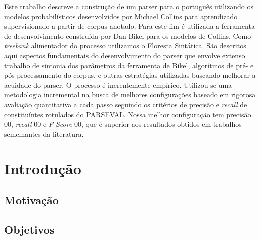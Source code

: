 \documentclass[a4paper]{abnt}
\begin{document}


\pagestyle{plain}


\begin{resumo}

Este trabalho descreve a construção de um parser para o português utilizando os modelos probabilísticos desenvolvidos por Michael Collins para aprendizado supervisionado a partir de corpus anotado. 
Para este fim é utilizada a ferramenta de desenvolvimento construída por Dan Bikel para os modelos de Collins. 
Como \emph{treebank} alimentador do processo utilizamos o Floresta Sintática.
São descritos aqui aspectos fundamentais do desenvolvimento do parser que envolve extenso trabalho de sintonia dos parâmetros da ferramenta de Bikel, algorítmos de pré- e pós-processamento do corpus, e outras estratégias utilizadas buscando melhorar a acuidade do parser. 
O processo é inerentemente empírico. Utilizou-se uma metodologia incremental na busca de melhores configurações baseado em rigorosa avaliação quantitativa a cada passo seguindo os critérios de precisão e \emph{recall} de constituíntes rotulados do PARSEVAL. 
Nossa melhor configuração tem precisão 00, \emph{recall} 00 e \emph{F-Score} 00, que é superior aos resultados obtidos em trabalhos semelhantes da literatura.

\end{resumo}


\tableofcontents
\listoffigures
\listoftables

%


\setcounter{page}{0}


\chapter{Introdução}
\label{cha:introducao}
\thispagestyle{empty}
    

\section{Motivação}
\label{sec:motivacao}
	

\section{Objetivos}
\label{sec:objetivos}
	
\end{document}
